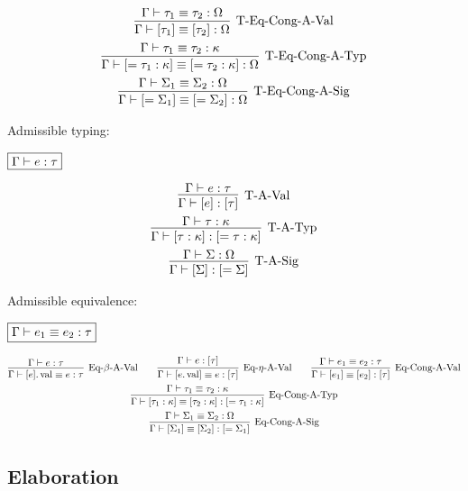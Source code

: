 \begin{gather*}
  \infer[\text{T-Eq-Cong-A-Val}]{\Gamma \vdash [\tau_1] \equiv [\tau_2]: \Omega}{
    \Gamma \vdash \tau_1 \equiv \tau_2: \Omega
  }
  \\
  \infer[\text{T-Eq-Cong-A-Typ}]{\Gamma \vdash [= \tau_1: \kappa] \equiv [= \tau_2: \kappa]: \Omega}{
    \Gamma \vdash \tau_1 \equiv \tau_2: \kappa
  }
  \\
  \infer[\text{T-Eq-Cong-A-Sig}]{\Gamma \vdash [= \Sigma_1] \equiv [= \Sigma_2]: \Omega}{
    \Gamma \vdash \Sigma_1 \equiv \Sigma_2: \Omega
  }
\end{gather*}

Admissible typing:

$\fbox{$\Gamma \vdash e: \tau$}$

\begin{gather*}
  \infer[\text{T-A-Val}]{\Gamma \vdash [e]: [\tau]}{
    \Gamma \vdash e: \tau
  }
  \\
  \infer[\text{T-A-Typ}]{\Gamma \vdash [\tau: \kappa]: [= \tau: \kappa]}{
    \Gamma \vdash \tau: \kappa
  }
  \\
  \infer[\text{T-A-Sig}]{\Gamma \vdash [\Sigma]: [= \Sigma]}{
    \Gamma \vdash \Sigma: \Omega
  }
\end{gather*}

Admissible equivalence:

$\fbox{$\Gamma \vdash e_1 \equiv e_2: \tau$}$

\begin{gather*}
  \infer[\text{Eq-$\beta$-A-Val}]{\Gamma \vdash [e].\symval \equiv e: \tau}{
    \Gamma \vdash e: \tau
  }
  \hspace{2em}
  \infer[\text{Eq-$\eta$-A-Val}]{\Gamma \vdash [e.\symval] \equiv e: [\tau]}{
    \Gamma \vdash e: [\tau]
  }
  \hspace{2em}
  \infer[\text{Eq-Cong-A-Val}]{\Gamma \vdash [e_1] \equiv [e_2]: [\tau]}{
    \Gamma \vdash e_1 \equiv e_2: \tau
  }
  \\
  \infer[\text{Eq-Cong-A-Typ}]{\Gamma \vdash [\tau_1: \kappa] \equiv [\tau_2: \kappa]: [= \tau_1: \kappa]}{
    \Gamma \vdash \tau_1 \equiv \tau_2: \kappa
  }
  \\
  \infer[\text{Eq-Cong-A-Sig}]{\Gamma \vdash [\Sigma_1] \equiv [\Sigma_2]: [= \Sigma_1]}{
    \Gamma \vdash \Sigma_1 \equiv \Sigma_2: \Omega
  }
\end{gather*}

\subsection{Elaboration}

